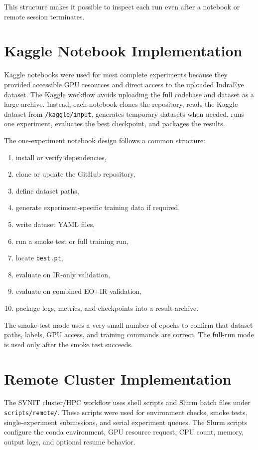 This structure makes it possible to inspect each run even after a notebook or remote session terminates.

\section{Kaggle Notebook Implementation}

Kaggle notebooks were used for most complete experiments because they provided accessible GPU resources and direct access to the uploaded IndraEye dataset. The Kaggle workflow avoids uploading the full codebase and dataset as a large archive. Instead, each notebook clones the repository, reads the Kaggle dataset from \texttt{/kaggle/input}, generates temporary datasets when needed, runs one experiment, evaluates the best checkpoint, and packages the results.

The one-experiment notebook design follows a common structure:

\begin{enumerate}
    \item install or verify dependencies,
    \item clone or update the GitHub repository,
    \item define dataset paths,
    \item generate experiment-specific training data if required,
    \item write dataset YAML files,
    \item run a smoke test or full training run,
    \item locate \texttt{best.pt},
    \item evaluate on IR-only validation,
    \item evaluate on combined EO+IR validation,
    \item package logs, metrics, and checkpoints into a result archive.
\end{enumerate}

The smoke-test mode uses a very small number of epochs to confirm that dataset paths, labels, GPU access, and training commands are correct. The full-run mode is used only after the smoke test succeeds.

\section{Remote Cluster Implementation}

The SVNIT cluster/HPC workflow uses shell scripts and Slurm batch files under \texttt{scripts/remote/}. These scripts were used for environment checks, smoke tests, single-experiment submissions, and serial experiment queues. The Slurm scripts configure the conda environment, GPU resource request, CPU count, memory, output logs, and optional resume behavior.

